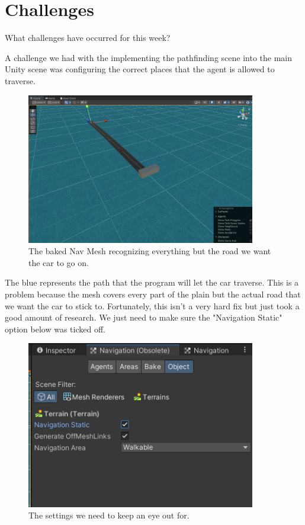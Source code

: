\section{Challenges}

What challenges have occurred for this week?

A challenge we had with the implementing the pathfinding scene into the main Unity scene was configuring the correct places that the agent is allowed to traverse. 

\begin{figure}[htb]
    \centering
    \includegraphics[width=10cm]{../Images/Update3/WrongMesh.png}
       \caption{The baked Nav Mesh recognizing everything but the road we want the car to go on.}
           \label{Fig:Wrong Path}
\end{figure}

\begin{flushleft}
The blue represents the path that the program will let the car traverse. This is a problem because the mesh covers every part of the plain but the actual road that we want the car to stick to. Fortunately, this isn't a very hard fix but just took a good amount of research. We just need to make sure the "Navigation Static" option below was ticked off.
\end{flushleft}

\begin{figure}[!ht]
    \centering
    \includegraphics[width=10cm]{../Images/Update3/MeshSetting.png}
       \caption{The settings we need to keep an eye out for.}
           \label{Fig: Bake Mesh Settings}
   \end{figure}

